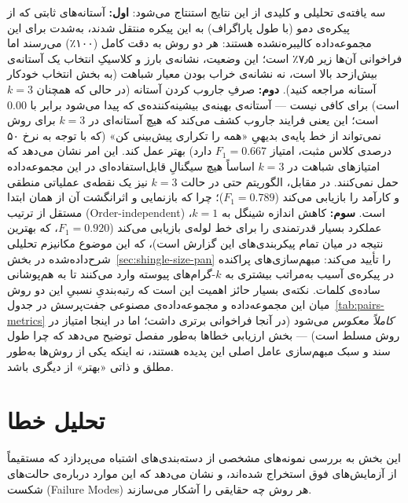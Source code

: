 \documentclass[11pt,a4paper]{article}
\begin{document}
	سه یافته‌ی تحلیلی و کلیدی از این نتایج استنتاج می‌شود:
	\textbf{اول:} آستانه‌های ثابتی که از پیکره‌ی دمو (با طول پاراگراف) به این پیکره منتقل شدند، به‌شدت برای این مجموعه‌داده کالیبره‌نشده هستند: هر دو روش به دقت کامل (۱۰۰٪) می‌رسند اما فراخوانی آن‌ها زیر ۷٫۵٪ است؛ این وضعیت، نشانه‌ی بارز و کلاسیکِ انتخاب یک آستانه‌ی بیش‌ازحد بالا است، نه نشانه‌ی خراب بودن معیار شباهت (به بخش انتخاب خودکار آستانه مراجعه کنید).
	\textbf{دوم:} صرفِ جاروب کردن آستانه (در حالی که همچنان $k=3$ است) برای  کافی نیست — آستانه‌ی بهینه‌ی بیشینه‌کننده‌ی  که پیدا می‌شود برابر با $0.00$ است؛ این یعنی فرایند جاروب کشف می‌کند که هیچ آستانه‌ای در $k=3$ برای روش  نمی‌تواند از خط پایه‌ی بدیهیِ «همه را تکراری پیش‌بینی کن» (که با توجه به نرخ ۵۰ درصدی کلاس مثبت، امتیاز $F_1=0.667$ دارد) بهتر عمل کند. این امر نشان می‌دهد که امتیازهای شباهت در $k=3$ اساساً هیچ سیگنالِ قابل‌استفاده‌ای در این مجموعه‌داده حمل نمی‌کنند. در مقابل، الگوریتم  حتی در حالت $k=3$ نیز یک نقطه‌ی عملیاتی منطقی و کارآمد را بازیابی می‌کند ($F_1=0.789$)؛ چرا که بازنمایی و اثرانگشت آن از همان ابتدا مستقل از ترتیب (Order-independent) است.
	\textbf{سوم:} کاهش اندازه شینگل به $k=1$، عملکرد بسیار قدرتمندی را برای خط لوله‌ی  بازیابی می‌کند ($F_1=0.920$، که بهترین نتیجه در میان تمام پیکربندی‌های این گزارش است)، که این موضوع مکانیزم تحلیلی شرح‌داده‌شده در بخش~\ref{sec:shingle-size-pan} را تأیید می‌کند: مبهم‌سازی‌های پراکنده در پیکره‌ی  آسیب به‌مراتب بیشتری به $k$-گرام‌های پیوسته وارد می‌کنند تا به هم‌پوشانی ساده‌ی کلمات. نکته‌ی بسیار حائز اهمیت این است که رتبه‌بندیِ نسبیِ این دو روش میان این مجموعه‌داده و مجموعه‌داده‌ی مصنوعی جفت‌پرسش در جدول~\ref{tab:pairs-metrics} \emph{کاملاً معکوس} می‌شود (در آنجا فراخوانی  برتری داشت؛ اما در اینجا امتیاز  در روش  مسلط است) — بخش ارزیابی خطاها به‌طور مفصل توضیح می‌دهد که چرا طول سند و سبک مبهم‌سازی عامل اصلی این پدیده هستند، نه اینکه یکی از روش‌ها به‌طور مطلق و ذاتی «بهتر» از دیگری باشد.
	
	
	
	\section{تحلیل خطا}
	\label{sec:error-analysis}
	
	این بخش به بررسی نمونه‌های مشخصی از دسته‌بندی‌های اشتباه می‌پردازد که مستقیماً از آزمایش‌های فوق استخراج شده‌اند، و نشان می‌دهد که این موارد درباره‌ی حالت‌های شکست (Failure Modes) هر روش چه حقایقی را آشکار می‌سازند.
	
\end{document}

